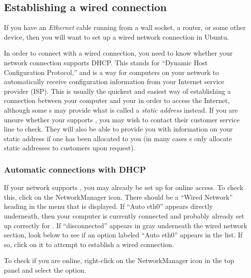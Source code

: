 \subsection{Establishing a wired connection}

If you have an \emph{Ethernet} cable running from a wall socket, a router, or some other device, then you will want to set up a wired network connection in Ubuntu.

In order to connect with a wired connection, you need to know whether your network connection supports \gls{DHCP}. This stands for ``Dynamic Host Configuration Protocol,'' and is a way for computers
on your network to automatically receive configuration information from your Internet service provider (\gls{ISP}). This is usually the quickest and easiest way of establishing a connection between your computer and your  in order to access the Internet, although some s may provide what is called a \emph{static address} instead. If you are unsure whether your  supports , you may wish to contact their customer service line to check. They will also be able to provide you with information on your static address if one has been allocated to you (in many cases s only allocate static addresses to customers upon request).

\subsubsection{Automatic connections with DHCP}

If your network supports , you may already be set up for online access. To check this, click on the NetworkManager icon. There should be a ``Wired Network'' heading in the menu that is displayed. If ``Auto eth$0$'' appears directly underneath, then your computer is currently connected and probably already set up correctly for . If ``disconnected'' appears in gray underneath the wired network section, look below to see if an option labeled ``Auto eth$0$'' appears in the list. If so, click on it to attempt to establish a wired connection. 

To check if you are online, right-click on the NetworkManager icon in the top panel and select the  option.

